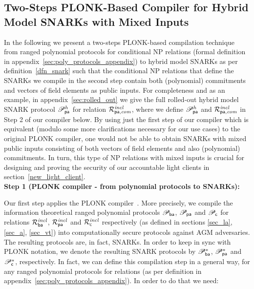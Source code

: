 \subsection{Two-Steps PLONK-Based Compiler for Hybrid Model SNARKs with Mixed Inputs}
\label{sec_two_step_compiler}

\noindent In the following we present a two-steps PLONK-based compilation technique from 
ranged polynomial protocols for conditional NP relations (formal definition in appendix~\ref{sec:poly_protocols_appendix}) to hybrid model SNARKs as per 
definition~\ref{dfn_snark} such that the conditional NP relations that define the SNARKs we compile in the second step contain both 
(polynomial) commitments and vectors of field elements as public inputs. For completeness and as an example, in appendix~\ref{sec:rolled_out} 
we give the full rolled-out hybrid model SNARK protocol $\mathscr{P}_{\mathsf{pa}}^{h}$ for relation $\mathcal{R}^{\mathit{incl}}_{\mathsf{pa},\mathit{com}}$, where we define $\mathscr{P}_{\mathsf{pa}}^{h}$ and $\mathcal{R}^{\mathit{incl}}_{\mathsf{pa},\mathit{com}}$ in Step 2 of our compiler 
below. By using just the first step of our compiler which is equivalent (modulo some more clarifications necessary for our use cases) 
to the original PLONK compiler, one would not be able to obtain SNARKs with mixed public inputs consisting of both vectors of field 
elements and also (polynomial) commitments. In turn, this type of NP relations with mixed inputs is crucial for designing and proving the security of our 
accountable light clients in section~\ref{new_light_client}.\\

\noindent \textbf{Step 1 (PLONK compiler - from polynomial protocols to SNARKs):} \\
\label{compiler_step_1}

\noindent Our first step applies the PLONK compiler~\cite{plonk}. More precisely, we compile the information theoretical 
ranged polynomial protocols $\mathscr{P}_{\mathsf{ba}}$, $\mathscr{P}_{\mathsf{pa}}$ and 
$\mathscr{P}_{\mathsf{c}}$ for relations $\mathcal{R}^{\mathit{incl}}_{\mathsf{ba}}$, $\mathcal{R}^{\mathit{incl}}_{\mathsf{pa}}$ 
and $\mathcal{R}^{\mathit{incl}}_{\mathsf{c}}$ respectively (as defined in sections \ref{sec_la}, \ref{sec_a}, \ref{sec_vt}) into 
computationally secure protocols against AGM adversaries. The resulting protocols are, in fact, SNARKs. 
In order to keep in sync with PLONK notation, we denote the resulting SNARK protocols by $\mathscr{P}_{\mathsf{ba}}^{\ast}$, 
$\mathscr{P}_{\mathsf{pa}}^{\ast}$ and $\mathscr{P}_{\mathsf{c}}^{\ast}$, respectively. In fact, we can define this compilation step in 
a general way, for any ranged polynomial protocols for relations (as per definition in appendix~\ref{sec:poly_protocols_appendix}). 
In order to do that we need: 

